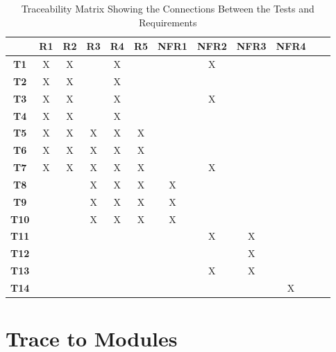\documentclass[12pt, titlepage]{article}
\begin{document}
\begin{emumerate}
\begin{table}[h!]
  \centering
  \begin{tabular}{|c|c|c|c|c|c|c|c|c|c|c|c|}
  \hline
    & R1
    & R2
    & R3
    & R4
    & R5
    & NFR1
    & NFR2
    & NFR3
    & NFR4
  \\ \hline
  \textbf{T1}          &X&X& &X& & &X& & \\ \hline
  \textbf{T2}            &X&X& &X& & & & & \\ \hline
  \textbf{T3}           &X&X& &X& & &X& & \\ \hline
  \textbf{T4}            &X&X& &X& & & & & \\ \hline
  \textbf{T5}          &X&X&X&X&X& & & & \\ \hline
  \textbf{T6}           &X&X&X&X&X& & & & \\ \hline
  \textbf{T7}           &X&X&X&X&X& &X& & \\ \hline
  \textbf{T8}            & & &X&X&X&X& & & \\ \hline
  \textbf{T9}             & & &X&X&X&X& & & \\ \hline
  \textbf{T10}            & & &X&X&X&X& & & \\ \hline
  \textbf{T11}      & & & & & & &X&X& \\ \hline
  \textbf{T12}               & & & & & & & &X& \\ \hline
  \textbf{T13}            & & & & & & &X&X& \\ \hline
  \textbf{T14}          & & & & & & & & &X\\ \hline
  \end{tabular}
  \caption{Traceability Matrix Showing the Connections Between the Tests and Requirements}
  \label{Table:A_trace}
\end{table}
		
\section{Trace to Modules}


\end{emumerate}
\end{document}
